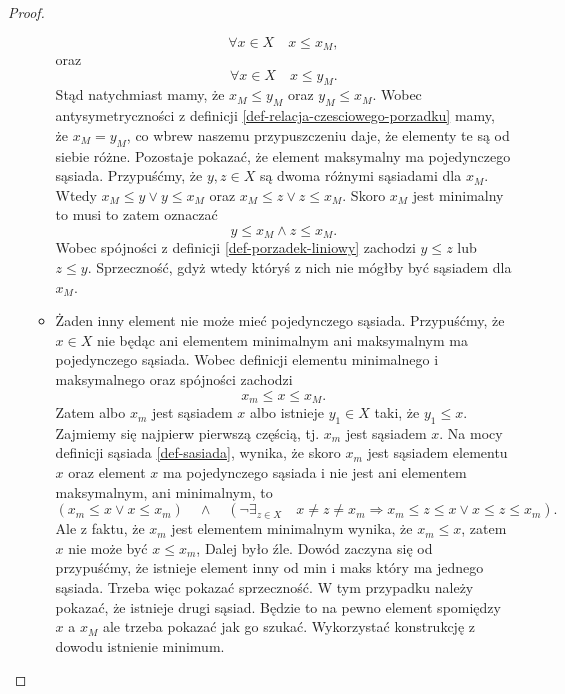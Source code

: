 \documentclass[12pt,a4paper]{report}
\begin{document}
\begin{proof}
\begin{enumerate}
\begin{itemize}
$$
\forall x \in X \quad x \leq x_M,
$$
oraz 
$$
\forall x \in X \quad x \leq y_M.
$$
Stąd natychmiast mamy, że $x_M \leq y_M$ oraz $y_M \leq  x_M$. Wobec antysymetryczności z definicji \ref{def-relacja-czesciowego-porzadku} mamy, że $x_M = y_M$, co wbrew naszemu przypuszczeniu daje, że elementy te są od siebie różne.
Pozostaje pokazać, że element maksymalny ma pojedynczego sąsiada. Przypuśćmy, że $y,z \in X$ są dwoma różnymi sąsiadami dla $x_M$. Wtedy $ x_M \leq y \lor y \leq x_M$ oraz $ x_M \leq z \lor z \leq x_M$. Skoro $x_M$ jest minimalny to musi to zatem oznaczać
$$
y \leq x_M \land z \leq x_M.
$$ 
Wobec spójności z definicji \ref{def-porzadek-liniowy} zachodzi $y \leq z$ lub $z \leq y$. Sprzeczność, gdyż wtedy któryś z nich nie mógłby być sąsiadem dla $x_M$.

\item Żaden inny element nie może mieć pojedynczego sąsiada. Przypuśćmy, że $x \in X$ nie będąc ani elementem minimalnym ani maksymalnym ma pojedynczego sąsiada. Wobec definicji elementu minimalnego i maksymalnego oraz spójności zachodzi
$$
x_m \leq x \leq x_M.
$$
Zatem albo $x_m$ jest sąsiadem $x$ albo istnieje $y_1 \in X$ taki, że $y_1 \leq x$.
\newline
Zajmiemy się najpierw pierwszą częścią, tj. $x_m$ jest sąsiadem $x$. Na mocy definicji sąsiada \ref{def-sasiada}, wynika, że skoro $x_m$ jest sąsiadem elementu $x$ oraz element $x$ ma pojedynczego sąsiada i nie jest ani elementem maksymalnym, ani minimalnym, to  
$$
\left(x_m \leq x \lor x \leq x_m\right) \quad \land \quad \left(\lnot \exists_{z \in X}  \quad x\neq z \neq x_m \Rightarrow   x_m \leq z \leq x \lor x \leq z \leq x_m \right) .
$$
Ale z faktu, że $x_m$ jest elementem minimalnym wynika, że $x_m \leq x$, zatem $x$ nie może być $x \leq x_m$, {\color{red}Dalej było źle. Dowód zaczyna się od przypuśćmy, że istnieje element inny od min i maks który ma jednego sąsiada. Trzeba więc pokazać sprzeczność. W tym przypadku należy pokazać, że istnieje drugi sąsiad. Będzie to na pewno element spomiędzy $x$ a $x_M$ ale trzeba pokazać jak go szukać. Wykorzystać konstrukcję z dowodu istnienie minimum.}


\end{itemize}
\end{enumerate}
\end{proof}
\end{document}
